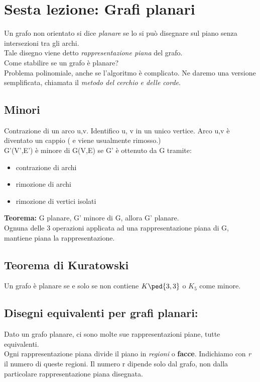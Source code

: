 \section{Sesta lezione: Grafi planari}
Un grafo non orientato si dice \emph{planare} se lo si può disegnare sul piano senza intersezioni tra gli archi. \\
Tale disegno viene detto \emph{rappresentazione piana} del grafo.\\

\noindent
Come stabilire se un grafo è planare? \\
Problema polinomiale, anche se l'algoritmo è complicato. Ne daremo una versione semplificata, chiamata il \emph{metodo del cerchio e delle corde}.

\subsection{Minori}
Contrazione di un arco u,v. Identifico u, v in un unico vertice. Arco u,v è diventato
un cappio ( e viene usualmente rimosso.) \\
G'(V',E') è minore di G(V,E) se G' è ottenuto da G tramite:
\begin{itemize}
\item contrazione di archi
\item rimozione di archi
\item rimozione di vertici isolati
\end{itemize}
\textbf{Teorema:} G planare, G' minore di G, allora G' planare. \\
Ognuna delle 3 operazioni applicata ad una rappresentazione piana di G, mantiene piana la rappresentazione.

\subsection{Teorema di Kuratowski}
Un grafo è planare se e solo se non contiene $K\ped{3,3}$ o $K_5$ come minore.\\

\noindent
\subsection{Disegni equivalenti per grafi planari:} Dato un grafo planare, ci sono molte sue rappresentazioni piane, tutte equivalenti. \\
Ogni rappresentazione piana divide il piano in \emph{regioni} o \textbf{facce}. Indichiamo con \emph{r} il numero di queste
regioni. Il numero r dipende solo dal grafo, non dalla particolare rappresentazione piana disegnata. 

